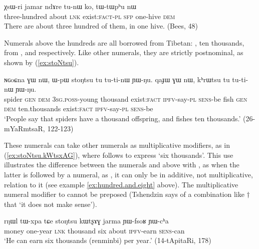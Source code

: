 \begin{exe}
\ex \label{ex:three.hundreds}
\gll χsɯ-ri 	jamar 	ndɤre 	tu-nɯ 	ko, 	tɯ-tɯpʰu 	nɯ \\
three-hundred about \textsc{lnk} exist:\textsc{fact-pl} \textsc{sfp} one-hive \textsc{dem} \\
\glt There are about three hundred of them, in one hive. (Bees, 48)
\end{exe}
 
  Numerals above the hundreds are all borrowed from Tibetan: ,  {ten thousands},  from ,  and  respectively.  Like other numerals, they are strictly postnominal, as shown by (\ref{ex:stoNtsu}).


\begin{exe}
\ex \label{ex:stoNtsu}
\gll ɴɢoɕna ɣɯ nɯ, ɯ-pɯ stoŋtsu tu tu-ti-nɯ ɲɯ-ŋu. qaɟɯ ɣɯ nɯ, kʰrɯtsu tu tu-ti-nɯ ɲɯ-ŋu. \\
spider \textsc{gen} \textsc{dem} \textsc{3sg}.\textsc{poss}-young thousand exist:\textsc{fact} \textsc{ipfv}-say-\textsc{pl} \textsc{sens}-be fish \textsc{gen} \textsc{dem} ten.thousands exist:\textsc{fact} \textsc{ipfv}-say-\textsc{pl} \textsc{sens}-be  \\
\glt `People say that spiders have a thousand offspring, and fishes ten thousands.' (26-mYaRmtsaR, 122-123)
\end{exe}

These numerals can take other numerals as multiplicative modifiers, as in (\ref{ex:stoNtsu.kWtsxAG}), where  follows   to express `six thousands'. This use illustrates the difference between the numerals  and above with , as when the latter is followed by a numeral, as , it can only be in additive, not multiplicative, relation to it (see example \ref{ex:hundred.and.eight} above). The multiplicative numeral modifier to  cannot be preposed (Tshendzin says of a combination like $\dagger$ that  `it does not make sense').

\begin{exe}
\ex  \label{ex:stoNtsu.kWtsxAG}
 \gll   rŋɯl tɯ-xpa tɕe stoŋtsu kɯtʂɤɣ jarma ɲɯ-fsoʁ ɲɯ-cʰa \\
 money one-year \textsc{lnk} thousand six about \textsc{ipfv}-earn \textsc{sens}-can \\
 \glt `He can earn six thousands (renminbi) per year.' (14-tApitaRi, 178)
 \end{exe}
  

